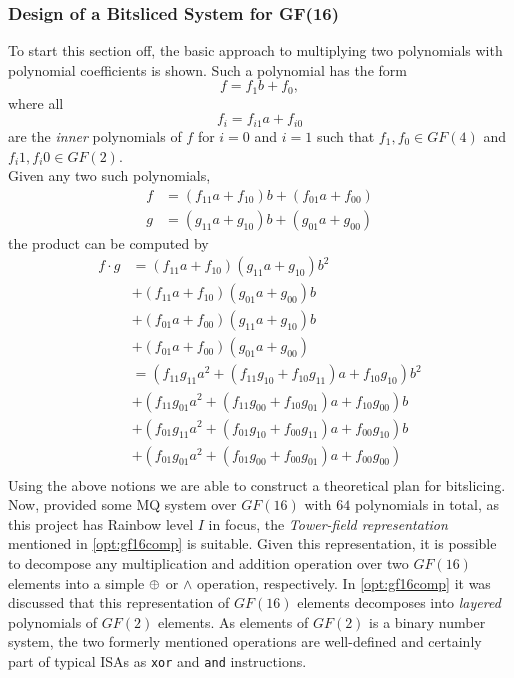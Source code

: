 \subsubsection{Design of a Bitsliced System for GF(16)} \label{bitslice:theory}
To start this section off, the basic approach to multiplying two polynomials with polynomial coefficients is shown. Such a polynomial has the form
$$
    f = f_1b + f_0,
$$
where all
$$
    f_i = f_{i1}a+f_{i0}
$$
are the \emph{inner} polynomials of $f$ for $i = 0$ and $i = 1$ such that $f_1, f_0 \in GF(4)$ and $f_i1, f_i0 \in GF(2)$.\\ 
Given any two such polynomials,
\begin{equation*}
    \begin{split}
        f &= (f_{11}a+f_{10})b + (f_{01}a + f_{00})\\
        g &= (g_{11}a+g_{10})b + (g_{01}a + g_{00})
    \end{split}
\end{equation*}
the product can be computed by
\begin{equation} \label{bitslice:poly}
    \begin{split}
        f \cdot g &= (f_{11}a + f_{10})(g_{11}a + g_{10})b^2\\
        &+ (f_{11} a + f_{10})(g_{01}a + g_{00})b\\ 
        &+ (f_{01}a + f_{00})(g_{11}a + g_{10})b\\ 
        &+ (f_{01} a + f_{00})(g_{01}a + g_{00})\\
        &= (f_{11}g_{11}a^2 + (f_{11}g_{10} + f_{10}g_{11})a + f_{10}g_{10})b^2\\
        &+ (f_{11}g_{01}a^2 + (f_{11}g_{00} + f_{10}g_{01})a + f_{10}g_{00})b\\
        &+ (f_{01}g_{11}a^2 + (f_{01}g_{10} + f_{00}g_{11})a + f_{00}g_{10})b\\
        &+ (f_{01}g_{01}a^2 + (f_{01}g_{00} + f_{00}g_{01})a + f_{00}g_{00})\\
    \end{split}
\end{equation}
Using the above notions we are able to construct a theoretical plan for bitslicing.
\medskip\\
Now, provided some MQ system over $GF(16)$ with $64$ polynomials in total, as this project has Rainbow level $I$ in focus, the \emph{Tower-field representation} mentioned in \cref{opt:gf16comp} is suitable. Given this representation, it is possible to decompose any multiplication and addition operation over two $GF(16)$ elements into a simple $\oplus$ or $\wedge$ operation, respectively. In \cref{opt:gf16comp} it was discussed that this representation of $GF(16)$ elements decomposes into \emph{layered} polynomials of $GF(2)$ elements. As elements of $GF(2)$ is a binary number system, the two formerly mentioned operations are well-defined and certainly part of typical ISAs as \texttt{xor} and \texttt{and} instructions.\medskip\\
